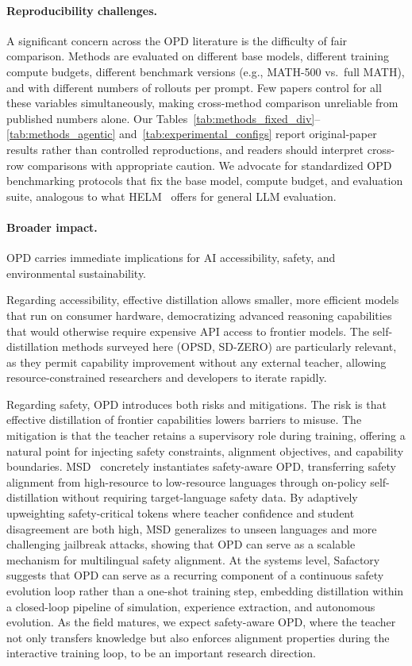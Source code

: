 \documentclass{article} %
\begin{document}
\paragraph{Reproducibility challenges.} A significant concern across the OPD literature is the difficulty of fair comparison. Methods are evaluated on different base models, different training compute budgets, different benchmark versions (e.g., MATH-500 vs.~full MATH), and with different numbers of rollouts per prompt. Few papers control for all these variables simultaneously, making cross-method comparison unreliable from published numbers alone. Our Tables~\ref{tab:methods_fixed_div}--\ref{tab:methods_agentic} and~\ref{tab:experimental_configs} report original-paper results rather than controlled reproductions, and readers should interpret cross-row comparisons with appropriate caution. We advocate for standardized OPD benchmarking protocols that fix the base model, compute budget, and evaluation suite, analogous to what HELM~\citep{2211.09110} offers for general LLM evaluation.

\paragraph{Broader impact.} OPD carries immediate implications for AI accessibility, safety, and environmental sustainability.

Regarding accessibility, effective distillation allows smaller, more efficient models that run on consumer hardware, democratizing advanced reasoning capabilities that would otherwise require expensive API access to frontier models. The self-distillation methods surveyed here (OPSD, SD-ZERO) are particularly relevant, as they permit capability improvement without any external teacher, allowing resource-constrained researchers and developers to iterate rapidly.

Regarding safety, OPD introduces both risks and mitigations. The risk is that effective distillation of frontier capabilities lowers barriers to misuse. The mitigation is that the teacher retains a supervisory role during training, offering a natural point for injecting safety constraints, alignment objectives, and capability boundaries. MSD~\citep{2605.02971} concretely instantiates safety-aware OPD, transferring safety alignment from high-resource to low-resource languages through on-policy self-distillation without requiring target-language safety data. By adaptively upweighting safety-critical tokens where teacher confidence and student disagreement are both high, MSD generalizes to unseen languages and more challenging jailbreak attacks, showing that OPD can serve as a scalable mechanism for multilingual safety alignment. At the systems level, Safactory~\citep{2605.06230} suggests that OPD can serve as a recurring component of a continuous safety evolution loop rather than a one-shot training step, embedding distillation within a closed-loop pipeline of simulation, experience extraction, and autonomous evolution. As the field matures, we expect safety-aware OPD, where the teacher not only transfers knowledge but also enforces alignment properties during the interactive training loop, to be an important research direction.
\end{document}
